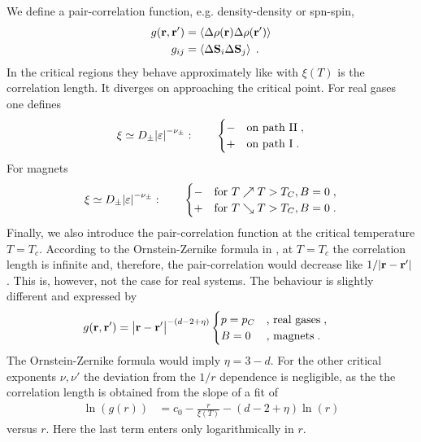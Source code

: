 \begin{enumerate}
We define a pair-correlation function, e.g. density-density or spn-spin,
%
\begin{align}
g(\mathbf r,\mathbf r') &= \left\langle\Delta \rho(\mathbf r) \Delta \rho(\mathbf r')\right\rangle\\
g_{ij} &= \left\langle\Delta \mathbf S_{i} \Delta \mathbf S_{j}\right\rangle\;.
\end{align}
%
In the critical regions they behave approximately like
%
%
with $\xi(T)$ is the correlation length.
It diverges on approaching the critical point.
For real gases one defines
%
\begin{align}\label{eq:}
\xi\simeq D_{\pm} \abs{\varepsilon}^{-\nu_{\pm}}
:\qquad \begin{cases}
-&\text{on path II}\;,\\
+&\text{on path I}\;.
\end{cases}
\end{align}
%
For magnets
\begin{align}\label{eq:}
\xi\simeq D_{\pm} \abs{\varepsilon}^{-\nu_{\pm}}
:\qquad
\begin{cases}
-	&\text{for }	T\nearrow T>T_{C}, B=0	\;,\\
+			&\text{for }	T\searrow T>T_{C}, B=0	\;.
\end{cases}
\end{align}
%
%
Finally, we also introduce the  pair-correlation function at the critical temperature $T=T_{c}$. According to the Ornstein-Zernike formula
in , at $T=T_{c}$ the correlation length is infinite and, therefore, the pair-correlation would decrease like
$1/\abs{\mathbf r-\mathbf r'}$. This is, however, not the case for real systems.
The behaviour is slightly different and expressed by
%
\begin{align*}
g(\mathbf r,\mathbf r') &=\big|\mathbf r-\mathbf r'\big|^{-(d-2+\eta)}
\begin{cases}
p=p_{C}  &\text{, real gases}\;,\\
B=0 	 &\text{, magnets}\;.
\end{cases}
\end{align*}
%
The Ornstein-Zernike formula would imply $\eta = 3-d$. For the other critical exponents $\nu,\nu'$ the deviation  from the $1/r$ dependence is negligible, as the the correlation length is obtained
from the slope of a fit of 
%
\begin{align*}
\ln(g(r)) &= c_{0} -\frac{r}{\xi(T)} - (d-2+\eta)\ln(r)
\end{align*}
%
versus $r$. Here the last term enters only logarithmically in $r$.
\end{enumerate}


